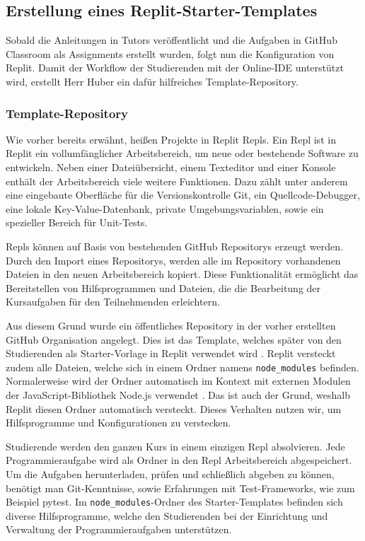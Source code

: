\newpage

\subsection{Erstellung eines Replit-Starter-Templates}\label{replit-template}
Sobald die Anleitungen in Tutors veröffentlicht und die Aufgaben in GitHub
Classroom als Assignments erstellt wurden, folgt nun die Konfiguration von
Replit. Damit der Workflow der Studierenden mit der Online-IDE unterstützt wird,
erstellt Herr Huber ein dafür hilfreiches Template-Repository.

\subsubsection{Template-Repository}\label{replit-template-repository}
Wie vorher bereits erwähnt, heißen Projekte in Replit Repls. Ein Repl ist in
Replit ein vollumfänglicher Arbeitsbereich, um neue oder bestehende Software zu
entwickeln. Neben einer Dateiübersicht, einem Text\-editor und einer Konsole
enthält der Arbeitsbereich viele weitere Funktionen. Dazu zählt unter anderem
eine eingebaute Oberfläche für die Versionskontrolle Git, ein
Quellcode-Debugger, eine lokale Key-Value-Datenbank, private Umgebungsvariablen,
sowie ein spezieller Bereich für Unit-Tests.

Repls können auf Basis von bestehenden GitHub Repositorys erzeugt werden. Durch
den Import eines Repositorys, werden alle im Repository vorhandenen Dateien
in den neuen Arbeitsbereich kopiert. Diese Funktionalität ermöglicht das
Bereitstellen von Hilfsprogrammen und Dateien, die die Bearbeitung der
Kursaufgaben für den Teilnehmenden erleichtern.

Aus diesem Grund wurde ein öffentliches Repository in der vorher erstellten
GitHub Organisation angelegt. Dies ist das Template, welches später von den
Studierenden als Starter-Vorlage in Replit verwendet wird
\parencite{git-repo:replit-template}. Replit versteckt zudem alle Dateien,
welche sich in einem Ordner namens \texttt{node\_modules} befinden.
Normalerweise wird der Ordner automatisch im Kontext mit externen Modulen der 
JavaScript-Bibliothek Node.js verwendet \parencite{nodejs}. Das ist auch der
Grund, weshalb Replit diesen Ordner automatisch versteckt. Dieses Verhalten
nutzen wir, um Hilfsprogramme und Konfigurationen zu verstecken.

Studierende werden den ganzen Kurs in einem einzigen Repl absolvieren. Jede
Programmieraufgabe wird als Ordner in den Repl Arbeitsbereich abgespeichert. Um
die Aufgaben herunterladen, prüfen und schließlich abgeben zu können, benötigt
man Git-Kenntnisse, sowie Erfahrungen mit Test-Frameworks, wie zum Beispiel
pytest. Im \texttt{node\_modules}-Ordner des Starter-Templates befinden sich
diverse Hilfsprogramme, welche den Studierenden bei der Einrichtung und
Verwaltung der Programmieraufgaben unterstützen.

